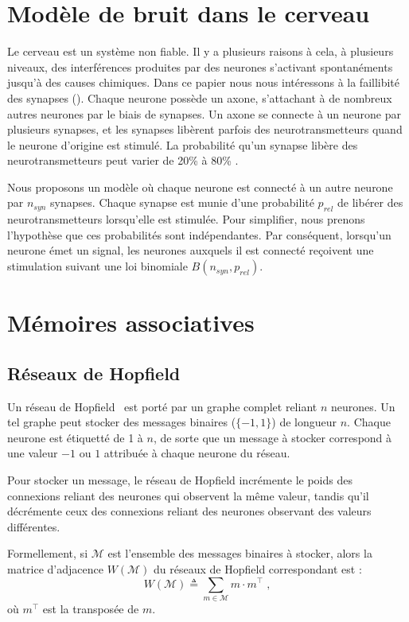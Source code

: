 \documentclass{gretsi}
\begin{document}
\section{Modèle de bruit dans le cerveau}

Le cerveau est un système non fiable. Il y a plusieurs raisons à cela, à plusieurs niveaux, des interférences produites par des neurones s'activant spontanéments jusqu'à des causes chimiques. Dans ce papier nous nous intéressons à la faillibité des synapses (\citep{zador1998impact}). Chaque neurone possède un axone, s'attachant à de nombreux autres neurones par le biais de synapses. Un axone se connecte à un neurone par plusieurs synapses, et les synapses libèrent parfois des neurotransmetteurs quand le neurone d'origine est stimulé. La probabilité qu'un synapse libère des neurotransmetteurs peut varier de 20\% à 80\% \citep{branco2009probability}.

Nous proposons un modèle où chaque neurone est connecté à un autre neurone par $n_{syn}$ synapses. Chaque synapse est munie d'une probabilité $p_{rel}$ de libérer des neurotransmetteurs lorsqu'elle est stimulée. Pour simplifier, nous prenons l'hypothèse que ces probabilités sont indépendantes. Par conséquent, lorsqu'un neurone émet un signal, les neurones auxquels il est connecté reçoivent une stimulation suivant une loi binomiale $B(n_{syn}, p_{rel})$.

\section{Mémoires associatives}

\subsection{Réseaux de Hopfield}

Un réseau de Hopfield~\cite{} est porté par un graphe complet reliant $n$ neurones. Un tel graphe peut stocker des messages binaires ($\{-1,1\}$) de longueur $n$. Chaque neurone est étiquetté de 1 à $n$, de sorte que un message à stocker correspond à une valeur $-1$ ou $1$ attribuée à chaque neurone du réseau.

Pour stocker un message, le réseau de Hopfield incrémente le poids des connexions reliant des neurones qui observent la même valeur, tandis qu'il décrémente ceux des connexions reliant des neurones observant des valeurs différentes.

Formellement, si $\mathcal{M}$ est l'ensemble des messages binaires à stocker, alors la matrice d'adjacence $W(\mathcal{M})$ du réseaux de Hopfield correspondant est :
\begin{equation}
 W(\mathcal{M}) \triangleq \sum_{m\in\mathcal{M}}{m \cdot m^{\top}}\;,
 \end{equation}
 où $m^\top$ est la transposée de $m$.
\end{document}
